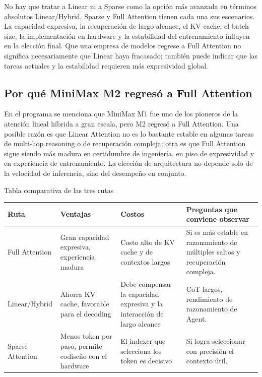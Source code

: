 \documentclass[a4paper]{article}
\begin{document}
\begin{warningbox}{No hay que tratar a Linear ni a Sparse como la opción más avanzada en términos absolutos}
Linear/Hybrid, Sparse y Full Attention tienen cada una sus escenarios. La capacidad expresiva, la recuperación de largo alcance, el KV cache, el batch size, la implementación en hardware y la estabilidad del entrenamiento influyen en la elección final. Que una empresa de modelos regrese a Full Attention no significa necesariamente que Linear haya fracasado; también puede indicar que las tareas actuales y la estabilidad requieren más expresividad global.
\end{warningbox}

\subsection{Por qué MiniMax M2 regresó a Full Attention}

En el programa se menciona que MiniMax M1 fue uno de los pioneros de la atención lineal híbrida a gran escala, pero M2 regresó a Full Attention. Una posible razón es que Linear Attention no es lo bastante estable en algunas tareas de multi-hop reasoning o de recuperación compleja; otra es que Full Attention sigue siendo más madura en certidumbre de ingeniería, en piso de expresividad y en experiencia de entrenamiento. La elección de arquitectura no depende solo de la velocidad de inferencia, sino del desempeño en conjunto.

\begin{knowledgebox}{Tabla comparativa de las tres rutas}
\begin{tabularx}{\textwidth}{p{}p{}p{}X}
\toprule
Ruta & Ventajas & Costos & Preguntas que conviene observar \\
\midrule
Full Attention & Gran capacidad expresiva, experiencia madura & Costo alto de KV cache y de contextos largos & Si es más estable en razonamiento de múltiples saltos y recuperación compleja. \\
Linear/Hybrid & Ahorra KV cache, favorable para el decoding & Debe compensar la capacidad expresiva y la interacción de largo alcance & CoT largos, rendimiento de razonamiento de Agent. \\
Sparse Attention & Menos token por paso, permite codiseño con el hardware & El indexer que selecciona los token es decisivo & Si logra seleccionar con precisión el contexto útil. \\
\bottomrule
\end{tabularx}
\end{knowledgebox}
\end{document}
